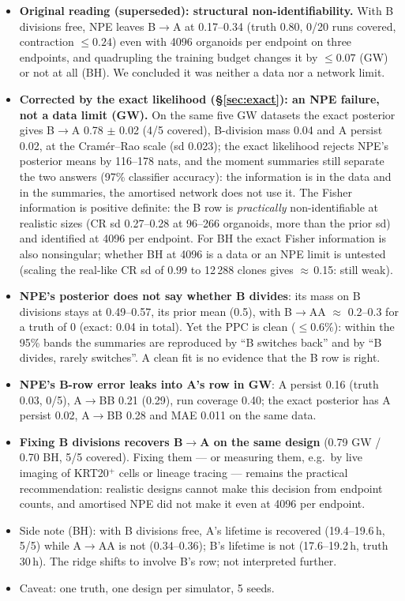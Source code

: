 \documentclass[10pt,a4paper]{article}
\begin{document}
\begin{itemize}
\item \textbf{Original reading (superseded): structural non-identifiability.} With B divisions free, NPE leaves B$\to$A at 0.17--0.34 (truth 0.80, 0/20 runs covered, contraction $\le 0.24$) even with 4096 organoids per endpoint on three endpoints, and quadrupling the training budget changes it by $\le 0.07$ (GW) or not at all (BH). We concluded it was neither a data nor a network limit.
\item \textbf{Corrected by the exact likelihood (\S\ref{sec:exact}): an NPE failure, not a data limit (GW).} On the same five GW datasets the exact posterior gives B$\to$A 0.78 $\pm$ 0.02 (4/5 covered), B-division mass 0.04 and A persist 0.02, at the Cram\'er--Rao scale (sd 0.023); the exact likelihood rejects NPE's posterior means by 116--178 nats, and the moment summaries still separate the two answers (97\% classifier accuracy): the information is in the data and in the summaries, the amortised network does not use it. The Fisher information is positive definite: the B row is \emph{practically} non-identifiable at realistic sizes (CR sd 0.27--0.28 at 96--266 organoids, more than the prior sd) and identified at 4096 per endpoint. For BH the exact Fisher information is also nonsingular; whether BH at 4096 is a data or an NPE limit is untested (scaling the real-like CR sd of 0.99 to 12\,288 clones gives $\approx$\,0.15: still weak).
\item \textbf{NPE's posterior does not say whether B divides}: its mass on B divisions stays at 0.49--0.57, its prior mean (0.5), with B$\to$AA $\approx$ 0.2--0.3 for a truth of 0 (exact: 0.04 in total). Yet the PPC is clean ($\le 0.6\%$): within the 95\% bands the summaries are reproduced by ``B switches back'' and by ``B divides, rarely switches''. A clean fit is no evidence that the B row is right.
\item \textbf{NPE's B-row error leaks into A's row in GW}: A persist 0.16 (truth 0.03, 0/5), A$\to$BB 0.21 (0.29), run coverage 0.40; the exact posterior has A persist 0.02, A$\to$BB 0.28 and MAE 0.011 on the same data.
\item \textbf{Fixing B divisions recovers B$\to$A on the same design} (0.79 GW / 0.70 BH, 5/5 covered). Fixing them --- or measuring them, e.g.\ by live imaging of KRT20$^+$ cells or lineage tracing --- remains the practical recommendation: realistic designs cannot make this decision from endpoint counts, and amortised NPE did not make it even at 4096 per endpoint.
\item Side note (BH): with B divisions free, A's lifetime is recovered (19.4--19.6\,h, 5/5) while A$\to$AA is not (0.34--0.36); B's lifetime is not (17.6--19.2\,h, truth 30\,h). The ridge shifts to involve B's row; not interpreted further.
\item Caveat: one truth, one design per simulator, 5 seeds.
\end{itemize}
\end{document}
